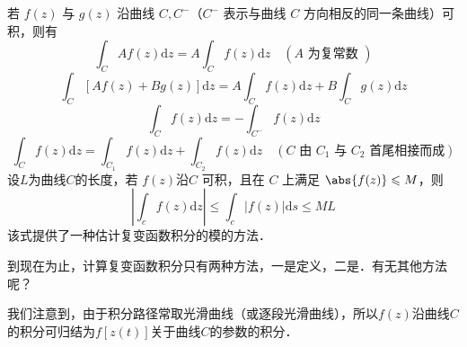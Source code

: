 若 $f(z)$ 与 $g(z)$ 沿曲线 $C,C^-$（$C^-$ 表示与曲线 $C$ 方向相反的同一条曲线）可积，则有
\begin{equation}
\int_{C} A f(z) \mathrm{d} z=A \int_{C} f(z) \mathrm{d} z \quad(A \text { 为复常数 })
\end{equation}
\begin{equation}
\int_{C}[Af(z)+ Bg(z)] \mathrm{d} z= A\int_{C} f(z) \mathrm{d} z + B\int_{C} g(z) \mathrm{d} z
\end{equation}
\begin{equation} 
\int_{C} f(z) \mathrm{d} z=-\int_{C^{-}} f(z) \mathrm{d} z
\end{equation}
\begin{equation}
\int_{C} f(z) \mathrm{d} z=\int_{C_{1}} f(z) \mathrm{d} z+\int_{C_{2}} f(z) \mathrm{d} z \quad\left(C \text{ 由 } C_{1} \text{ 与 } C_{2} \text { 首尾相接而成}\right)
\end{equation}
设$ L$为曲线$C$的长度，若 $f (z)$沿$C$ 可积，且在 $C$ 上满足 $\abs{f(z)} \leqslant M $，则
\begin{equation} \label{CpxInt_eq2}
\left|\int_{c} f(z) \mathrm{d} z\right| \leqslant \int_{c}|f(z)| \mathrm{d} s \leqslant M L
\end{equation}
该式提供了一种估计复变函数积分的模的方法．


到现在为止，计算复变函数积分只有两种方法，一是定义，二是．有无其他方法呢？

我们注意到，由于积分路径常取光滑曲线（或逐段光滑曲线），所以$ f (z) $沿曲线$C $的积分可归结为$f [z(t)]$关于曲线$C$的参数的积分．

